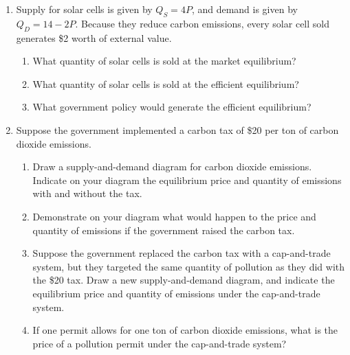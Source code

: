 \documentclass{article}
\begin{document}
\begin{enumerate}
\begin{enumerate}
	\end{enumerate}
	
\item Supply for solar cells is given by $Q_S = 4P$, and demand is given by $Q_D = 14 - 2P$. Because they reduce carbon emissions, every solar cell sold generates \$2 worth of external value.

	\begin{enumerate}
	
	\item What quantity of solar cells is sold at the market equilibrium?
	
	\item What  quantity of solar cells is sold at the efficient equilibrium? 
	
	\item What government policy would generate the efficient equilibrium?
	
	\end{enumerate}
	
\item Suppose the government implemented a carbon tax of \$20 per ton of carbon dioxide emissions.

	\begin{enumerate}
	
	\item Draw a supply-and-demand diagram for carbon dioxide emissions. Indicate on your diagram the equilibrium price and quantity of emissions with and without the tax.
	
	\item Demonstrate on your diagram what would happen to the price and quantity of emissions if the government raised the carbon tax.
	
	\item Suppose the government replaced the carbon tax with a cap-and-trade system, but they targeted the same quantity of pollution as they did with the \$20 tax. Draw a new supply-and-demand diagram, and indicate the equilibrium price and quantity of emissions under the cap-and-trade system.
	
	\item If one permit allows for one ton of carbon dioxide emissions, what is the price of a pollution permit under the cap-and-trade system?
	
	\end{enumerate}

\end{enumerate}
\end{document}
